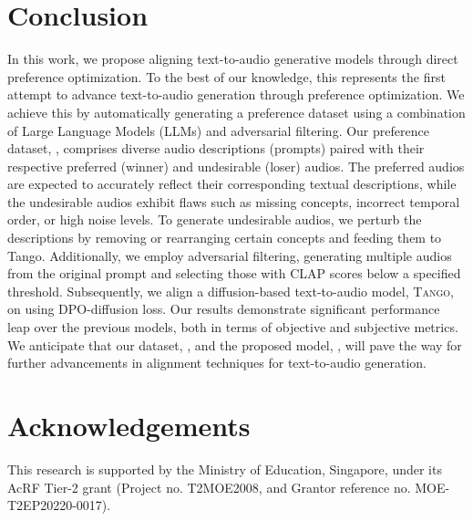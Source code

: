 \section{Conclusion}
In this work, we propose aligning text-to-audio generative models through direct preference optimization. To the best of our knowledge, this represents the first attempt to advance text-to-audio generation through preference optimization. We achieve this by automatically generating a preference dataset using a combination of Large Language Models (LLMs) and adversarial filtering. Our preference dataset, \dataset{}, comprises diverse audio descriptions (prompts) paired with their respective preferred (winner) and undesirable (loser) audios. The preferred audios are expected to accurately reflect their corresponding textual descriptions, while the undesirable audios exhibit flaws such as missing concepts, incorrect temporal order, or high noise levels. To generate undesirable audios, we perturb the descriptions by removing or rearranging certain concepts and feeding them to Tango. Additionally, we employ adversarial filtering, generating multiple audios from the original prompt and selecting those with CLAP scores below a specified threshold. Subsequently, we align a diffusion-based text-to-audio model, \textsc{Tango}, on \dataset{} using DPO-diffusion loss. Our results demonstrate significant performance leap over the previous models, both in terms of objective and subjective metrics. We anticipate that our dataset, \dataset{}, and the proposed model, \model{}, will pave the way for further advancements in alignment techniques for text-to-audio generation.
\section*{Acknowledgements}
This research is supported by the Ministry of Education, Singapore,
under its AcRF Tier-2 grant (Project no. T2MOE2008, and Grantor
reference no. MOE-T2EP20220-0017).

